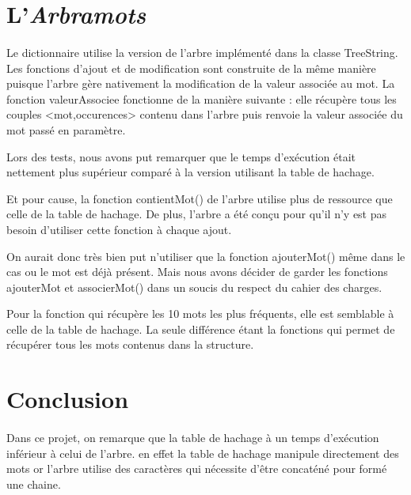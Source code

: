 \documentclass[12pt,a4paper,final]{article}
\begin{document}
\section{L'\emph{Arbramots}}
\paragraph{}{
Le dictionnaire utilise la version de l'arbre implémenté dans la classe TreeString.
Les fonctions d'ajout et de modification sont construite de la même manière puisque l'arbre gère nativement la modification de la valeur associée au mot.
La fonction valeurAssociee fonctionne de la manière suivante : elle récupère tous les couples <mot,occurences> contenu dans l'arbre puis renvoie la valeur associée du mot passé en paramètre.

Lors des tests, nous avons put remarquer que le temps d’exécution était nettement plus supérieur comparé à la version utilisant la table de hachage. 

Et pour cause, la fonction contientMot() de l'arbre utilise plus de ressource que celle de la table de hachage. De plus, l'arbre a été conçu pour qu'il n'y est pas besoin d'utiliser cette fonction à chaque ajout. 

On aurait donc très bien put n'utiliser que la fonction ajouterMot() même dans le cas ou le mot est déjà présent. Mais nous avons décider de garder les fonctions ajouterMot et associerMot() dans un soucis du respect du cahier des charges.

Pour la fonction qui récupère les 10 mots les plus fréquents, elle est semblable à celle de la table de hachage. La seule différence étant la fonctions qui permet de récupérer tous les mots contenus dans la structure.
}
\newpage
  
\section*{Conclusion}
\paragraph{}{
Dans ce projet, on remarque que la table de hachage à un temps d'exécution inférieur à celui de l'arbre. en effet la table de hachage manipule directement des mots or l'arbre utilise des caractères qui nécessite d'être concaténé pour formé une chaine. 
}
\end{document}
